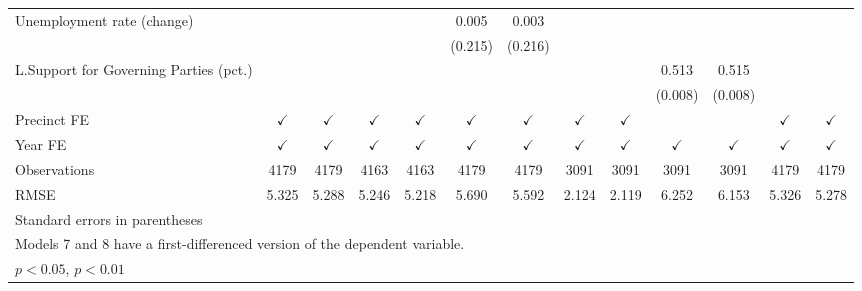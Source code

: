 \begin{sidewaystable}[htbp]
\begin{tabular}{l*{12}{c}}
Unemployment rate (change)&                    &                    &                    &                    &       0.005        &       0.003        &                    &                    &                    &                    &                    &                    \\
                    &                    &                    &                    &                    &     (0.215)        &     (0.216)        &                    &                    &                    &                    &                    &                    \\
L.Support for Governing Parties (pct.)&                    &                    &                    &                    &                    &                    &                    &                    &       0.513\sym{**}&       0.515\sym{**}&                    &                    \\
                    &                    &                    &                    &                    &                    &                    &                    &                    &     (0.008)        &     (0.008)        &                    &                    \\
\hline Precinct FE  &$\checkmark$        &$\checkmark$        &$\checkmark$        &$\checkmark$        &$\checkmark$        &$\checkmark$        &$\checkmark$        &$\checkmark$        &                    &                    &$\checkmark$        &$\checkmark$        \\
Year FE             &$\checkmark$        &$\checkmark$        &$\checkmark$        &$\checkmark$        &$\checkmark$        &$\checkmark$        &$\checkmark$        &$\checkmark$        &$\checkmark$        &$\checkmark$        &$\checkmark$        &$\checkmark$        \\
\hline
Observations        &        4179        &        4179        &        4163        &        4163        &        4179        &        4179        &        3091        &        3091        &        3091        &        3091        &        4179        &        4179        \\
RMSE                &       5.325        &       5.288        &       5.246        &       5.218        &       5.690        &       5.592        &       2.124        &       2.119        &       6.252        &       6.153        &       5.326        &       5.278        \\
\hline\hline
\multicolumn{13}{l}{\footnotesize Standard errors in parentheses}\\
\multicolumn{13}{l}{\footnotesize Models 7 and 8 have a first-differenced version of the dependent variable.}\\
\multicolumn{13}{l}{\footnotesize \sym{*} \(p<0.05\), \sym{**} \(p<0.01\)}\\
\end{tabular}
\end{sidewaystable}

